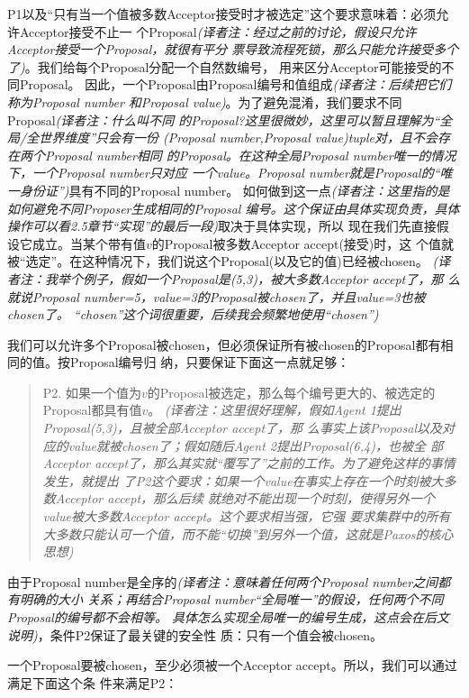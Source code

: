 P1以及“只有当一个值被多数Acceptor接受时才被选定”这个要求意味着：必须允许Acceptor接受不止一
个Proposal\emph{(译者注：经过之前的讨论，假设只允许Acceptor接受一个Proposal，就很有平分
票导致流程死锁，那么只能允许接受多个了)}。我们给每个Proposal分配一个自然数编号，
用来区分Acceptor可能接受的不同Proposal。
因此，一个Proposal由Proposal编号和值组成\emph{(译者注：后续把它们称为Proposal number
和Proposal value)}。为了避免混淆，我们要求不同Proposal\emph{(译者注：什么叫不同
的Proposal?这里很微妙，这里可以暂且理解为“全局/全世界维度”只会有一份
(Proposal number,Proposal value)tuple对，且不会存在两个Proposal number相同
的Proposal。在这种全局Proposal number唯一的情况下，一个Proposal number只对应
一个value。Proposal number就是Proposal的“唯一身份证”)}具有不同的Proposal number。
如何做到这一点\emph{(译者注：这里指的是如何避免不同Proposer生成相同的Proposal
编号。这个保证由具体实现负责，具体操作可以看2.5章节“实现”的最后一段)}取决于具体实现，所以
现在我们先直接假设它成立。当某个带有值\(v\)的Proposal被多数Acceptor accept(接受)时，这
个值就被“选定”。在这种情况下，我们说这个Proposal(以及它的值)已经被chosen。
\emph{(译者注：我举个例子，假如一个Proposal是(5,3)，被大多数Acceptor accept了，那
么就说Proposal number=5，value=3的Proposal被chosen了，并且value=3也被chosen了。
“chosen”这个词很重要，后续我会频繁地使用“chosen”)}

我们可以允许多个Proposal被chosen，但必须保证所有被chosen的Proposal都有相同的值。按Proposal编号归
纳，只要保证下面这一点就足够：

\begin{quote}
P2. 如果一个值为\(v\)的Proposal被选定，那么每个编号更大的、被选定的Proposal都具有值\(v\)。
\emph{(译者注：这里很好理解，假如Agent 1提出Proposal(5,3)，且被全部Acceptor accept了，那
么事实上该Proposal以及对应的value就被chosen了；假如随后Agent 2提出Proposal(6,4)，也被全
部Acceptor accept了，那么其实就“覆写了”之前的工作。为了避免这样的事情发生，就提出
了P2这个要求：如果一个value在事实上存在一个时刻被大多数Acceptor accept，那么后续
就绝对不能出现一个时刻，使得另外一个value被大多数Acceptor accept。这个要求相当强，它强
要求集群中的所有大多数只能认可一个值，而不能“切换”到另外一个值，这就是Paxos的核心思想)}
\end{quote}

由于Proposal number是全序的\emph{(译者注：意味着任何两个Proposal number之间都有明确的大小
关系；再结合Proposal number“全局唯一”的假设，任何两个不同Proposal的编号都不会相等。
具体怎么实现全局唯一的编号生成，这点会在后文说明)}，条件P2保证了最关键的安全性
质：只有一个值会被chosen。

一个Proposal要被chosen，至少必须被一个Acceptor accept。所以，我们可以通过满足下面这个条
件来满足P2：

